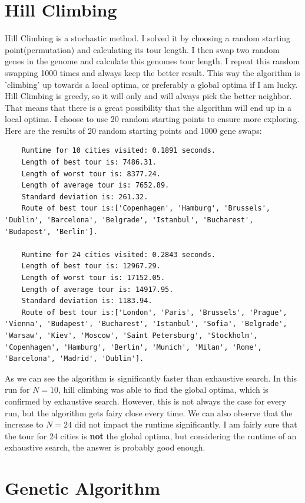 \documentclass[a4paper, norsk, 12pt]{article}
\begin{document}
\section{Hill Climbing}
Hill Climbing is a stochastic method. I solved it by choosing a random starting point(permutation) and calculating its tour length. I then swap two random genes in the genome and calculate this genomes tour length. I repeat this random swapping 1000 times and always keep the better result. This way the algorithm is 'climbing' up towards a local optima, or preferably a global optima if I am lucky. Hill Climbing is greedy, so it will only and will always pick the better neighbor. That means that there is a great possibility that the algorithm will end up in a local optima. I choose to use 20 random starting points to ensure more exploring.
\newline\newline
Here are the results of 20 random starting points and 1000 gene swaps: 
	\begin{lstlisting}
	Runtime for 10 cities visited: 0.1891 seconds.
	Length of best tour is: 7486.31.
 	Length of worst tour is: 8377.24.
 	Length of average tour is: 7652.89.
 	Standard deviation is: 261.32. 
 	Route of best tour is:['Copenhagen', 'Hamburg', 'Brussels', 'Dublin', 'Barcelona', 'Belgrade', 'Istanbul', 'Bucharest', 'Budapest', 'Berlin'].

	Runtime for 24 cities visited: 0.2843 seconds. 
	Length of best tour is: 12967.29.
 	Length of worst tour is: 17152.05.
 	Length of average tour is: 14917.95.
 	Standard deviation is: 1183.94. 
 	Route of best tour is:['London', 'Paris', 'Brussels', 'Prague', 'Vienna', 'Budapest', 'Bucharest', 'Istanbul', 'Sofia', 'Belgrade', 'Warsaw', 'Kiev', 'Moscow', 'Saint Petersburg', 'Stockholm', 'Copenhagen', 'Hamburg', 'Berlin', 'Munich', 'Milan', 'Rome', 'Barcelona', 'Madrid', 'Dublin'].
	\end{lstlisting}
	As we can see the algorithm is significantly faster than exhaustive search. In this run for $N = 10$, hill climbing was able to find the global optima, which is confirmed by exhaustive search. However, this is not always the case for every run, but the algorithm gets fairy close every time. We can also observe that the increase to $N = 24$ did not impact the runtime significantly. I am fairly sure that the tour for 24 cities is \textbf{not} the global optima, but considering the runtime of an exhaustive search, the answer is probably good enough.   

\section{Genetic Algorithm}
\end{document}
